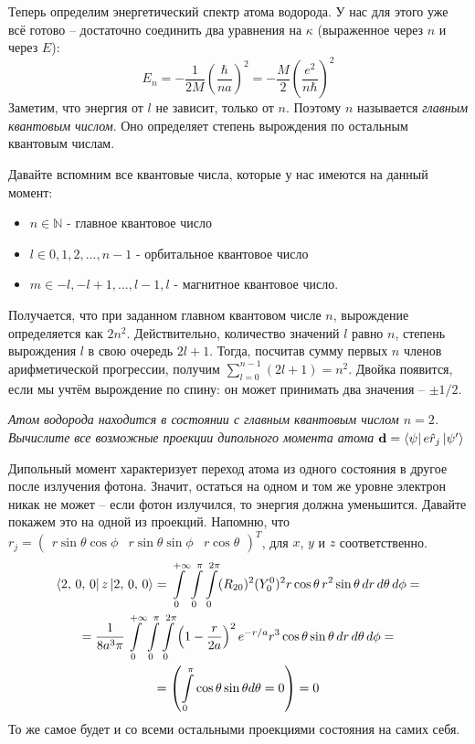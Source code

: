 Теперь определим энергетический спектр атома водорода. У нас для этого уже всё готово -- достаточно соединить два уравнения на $\kappa$ (выраженное через $n$ и через $E$):
\[
E_n = -\frac{1}{2M}\left(\frac{\hbar}{na}\right)^2 = -\frac{M}{2}\left(\frac{e^2}{n\hbar}\right)^2
\]
Заметим, что энергия от $l$ не зависит, только от $n$. Поэтому $n$ называется \textit{главным квантовым числом}. Оно определяет степень вырождения по остальным квантовым числам. 

Давайте вспомним все квантовые числа, которые у нас имеются на данный момент:
\begin{itemize}
    \item $n \in \mathbb{N}$ - главное квантовое число
    \item $l \in {0, 1, 2, ..., n-1}$ - орбитальное квантовое число
    \item $m \in {-l, -l+1, ... , l-1, l}$ - магнитное квантовое число.
\end{itemize}
Получается, что при заданном главном квантовом числе $n$, вырождение определяется как $2n^2$. Действительно, количество значений $l$ равно $n$, степень вырождения $l$ в свою очередь $2l+1$. Тогда, посчитав сумму первых $n$ членов арифметической прогрессии, получим $\sum\limits_{l=0}^{n-1}(2l +1 ) = n^2$. Двойка появится, если мы учтём вырождение по спину: он может принимать два значения -- $\pm 1/2$.

\begin{center}
    \textit{Атом водорода находится в состоянии с главным квантовым числом $n = 2$. Вычислите все возможные проекции дипольного момента атома $\mathbf{d} = \bra{\psi}e\hat{r}_j\ket{\psi'}$}
\end{center}

Дипольный момент характеризует переход атома из одного состояния в другое после излучения фотона. Значит, остаться на одном и том же уровне электрон никак не может -- если фотон излучился, то энергия должна уменьшится. Давайте покажем это на одной из проекций. Напомню, что $r_j = \begin{pmatrix}
    r\sin\theta\cos\phi & r\sin\theta\sin\phi & r\cos\theta
\end{pmatrix}^T$, для $x$, $y$ и $z$ соответственно.
\begin{gather*}
    \bra{2,\, 0,\, 0}z\ket{2,\, 0,\, 0} = \int\limits_{0}^{+\infty}\int\limits_{0}^{\pi}\int\limits_{0}^{2\pi}(R_{20})^2(Y^0_0)^2 r\cos\theta \, r^2\sin\theta \, dr\, d\theta\, d\phi =\\ = \frac{1}{8a^3\pi} \int\limits_{0}^{+\infty}\int\limits_{0}^{\pi}\int\limits_{0}^{2\pi} \left( 1 - \frac{r}{2a} \right)^2 e^{-r/a} r^3\cos\theta\sin\theta\, dr \, d\theta\, d\phi = \\  = \left(\int\limits_{0}^{\pi} \cos\theta \sin\theta d\theta = 0\right) = 0
\end{gather*}
То же самое будет и со всеми остальными проекциями состояния на самих себя. 

